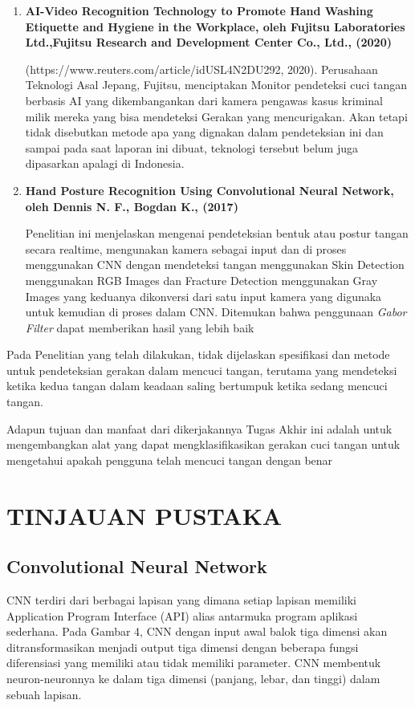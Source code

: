 \documentclass[a4paper]{article}
\begin{document}
		\begin{enumerate}
			\item \textbf {AI-Video Recognition Technology to Promote Hand Washing Etiquette and Hygiene in the Workplace, oleh Fujitsu Laboratories Ltd.,Fujitsu Research and Development Center Co., Ltd., (2020)}
				
			(https://www.reuters.com/article/idUSL4N2DU292, 2020). Perusahaan Teknologi Asal Jepang, Fujitsu, menciptakan Monitor pendeteksi cuci tangan berbasis AI yang dikembangankan dari kamera pengawas kasus kriminal milik mereka yang bisa mendeteksi Gerakan yang mencurigakan. Akan tetapi tidak disebutkan metode apa yang dignakan dalam pendeteksian ini dan sampai pada saat laporan ini dibuat, teknologi tersebut belum juga dipasarkan apalagi di Indonesia.
				
			\item \textbf{Hand Posture Recognition Using Convolutional Neural Network, oleh Dennis N. F., Bogdan K., (2017)}
				
			Penelitian ini menjelaskan mengenai pendeteksian bentuk atau postur tangan secara realtime, mengunakan kamera sebagai input dan di proses menggunakan CNN dengan mendeteksi  tangan menggunakan Skin Detection menggunakan RGB Images dan Fracture Detection menggunakan Gray Images yang keduanya dikonversi dari satu input kamera yang digunaka untuk kemudian di proses dalam CNN. Ditemukan bahwa penggunaan \textit{Gabor Filter} dapat memberikan hasil yang lebih baik
		\end{enumerate}

		\hspace{6mm}Pada Penelitian yang telah dilakukan, tidak dijelaskan spesifikasi dan metode untuk pendeteksian gerakan dalam mencuci tangan, terutama yang mendeteksi ketika kedua tangan dalam keadaan saling bertumpuk ketika sedang mencuci tangan.

		\hspace{6mm}Adapun tujuan dan manfaat dari dikerjakannya Tugas Akhir ini adalah untuk mengembangkan alat yang dapat mengklasifikasikan gerakan cuci tangan untuk mengetahui apakah pengguna telah mencuci tangan dengan benar
	
	\newpage
	\section{TINJAUAN PUSTAKA}
		\subsection{Convolutional Neural Network}
			\hspace{11mm}CNN terdiri dari berbagai lapisan yang dimana setiap lapisan memiliki Application Program Interface (API) alias antarmuka program aplikasi sederhana. Pada Gambar 4, CNN dengan input awal balok tiga dimensi akan ditransformasikan menjadi output tiga dimensi dengan beberapa fungsi diferensiasi yang memiliki atau tidak memiliki parameter. CNN membentuk neuron-neuronnya ke dalam tiga dimensi (panjang, lebar, dan tinggi) dalam sebuah lapisan. 
			
\end{document}
